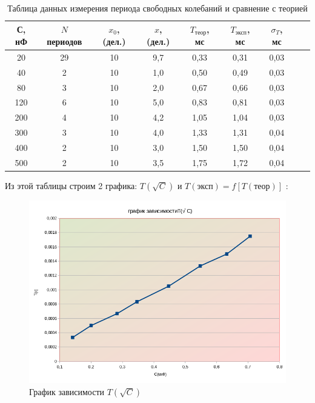 \documentclass[a4paper, 12pt]{article}%
\begin{document}
\begin{table}[h!]
\begin{center}
\begin{tabular}{|c|c|c|c|c|c|c|c|c|}
\hline
С, нФ & $N$ периодов & $x_0$, (дел.) & $x$, (дел.) & $T_{\text{теор}}$, мс & $T_{\text{эксп}}$, мс & $\sigma_T$, мс \\ \hline
20               & 29  & 10  &  9,7    & 0,33           & 0,31            & 0,03           \\ \hline
40               & 2   & 10  &  1,0    & 0,50           & 0,49            & 0,03           \\ \hline
80               & 3   & 10  &  2,0    & 0,67           & 0,66            & 0,03           \\ \hline
120              & 6   & 10  &  5,0    & 0,83           & 0,81            & 0,03           \\ \hline
200              & 4   & 10  &  4,2    & 1,05           & 1,04            & 0,03           \\ \hline
300              & 3   & 10  &  4,0    & 1,33           & 1,31            & 0,04           \\ \hline
400              & 2   & 10  &  3,0    & 1,50           & 1,50            & 0,04           \\ \hline
500              & 2   & 10  &  3,5    & 1,75           & 1,72            & 0,04           \\ \hline
\end{tabular}
\caption{Таблица данных измерения периода свободных колебаний и сравнение с теорией}
\end{center}
\end{table}

Из этой таблицы строим 2 графика: $T(\sqrt{C})$ и $T(\text{эксп}) = f\left[T(\text{теор})\right]$ :

\begin{figure}[h!]
\begin{center}
\includegraphics[width = 1.0\textwidth]{graph11.jpg}
\caption{График зависимости $T(\sqrt{C})$}
\end{center}
\end{figure}
\end{document}
